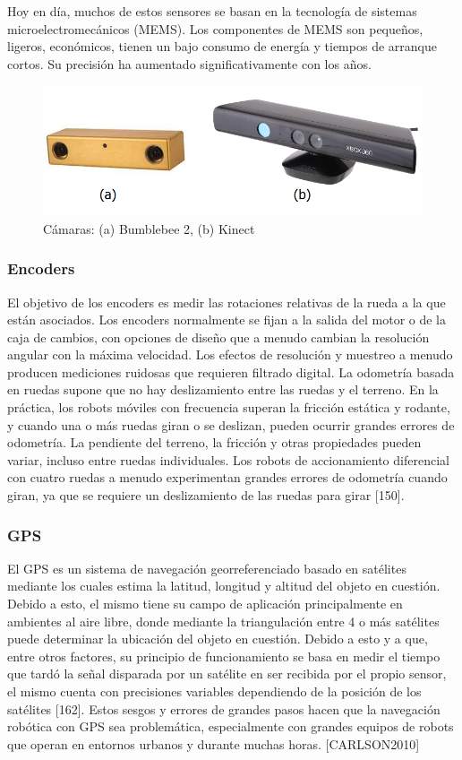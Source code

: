 Hoy en día, muchos de estos sensores se basan en la tecnología de sistemas microelectromecánicos (MEMS). Los componentes de MEMS son pequeños, ligeros, económicos, tienen un bajo consumo de energía y tiempos de arranque cortos. Su precisión ha aumentado significativamente con los años.

\begin{figure}
    \centering
    \includegraphics[width=.9\textwidth]{Img/bumblekinect}
    \caption{Cámaras: (a) Bumblebee 2, (b) Kinect}
    \label{fig:camaras}
\end{figure}

\subsubsection{Encoders}
El objetivo de los encoders es medir las rotaciones relativas de la rueda a la que están asociados. Los encoders normalmente se fijan a la salida del motor o de la caja de cambios, con opciones de diseño que a menudo cambian la resolución angular con la máxima velocidad. Los efectos de resolución y muestreo a menudo producen mediciones ruidosas que requieren filtrado digital. La odometría basada en ruedas supone que no hay deslizamiento entre las ruedas y el terreno. En la práctica, los robots móviles con frecuencia superan la fricción estática y rodante, y cuando una o más ruedas giran o se deslizan, pueden ocurrir grandes errores de odometría. La pendiente del terreno, la fricción y otras propiedades pueden variar, incluso entre ruedas individuales. Los robots de accionamiento diferencial con cuatro ruedas a menudo experimentan grandes errores de odometría cuando giran, ya que se requiere un deslizamiento de las ruedas para girar [150].

\subsubsection{GPS}
El GPS es un sistema de navegación georreferenciado basado en satélites mediante los cuales estima la latitud, longitud y altitud del objeto en cuestión. Debido a esto, el mismo tiene su campo de aplicación principalmente en ambientes al aire libre, donde mediante la triangulación entre 4 o más satélites puede determinar la ubicación del objeto en cuestión. Debido a esto y a que, entre otros factores, su principio de funcionamiento se basa en medir el tiempo que tardó la señal disparada por un satélite en ser recibida por el propio sensor, el mismo cuenta con precisiones variables dependiendo de la posición de los satélites [162]. Estos sesgos y errores de grandes pasos hacen que la navegación robótica con GPS sea problemática, especialmente con grandes equipos de robots que operan en entornos urbanos y durante muchas horas. [CARLSON2010]

